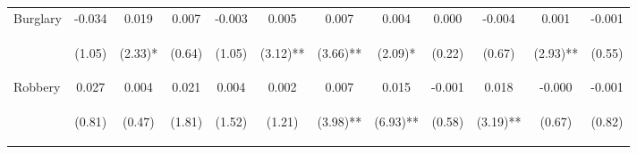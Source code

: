 \begin{tabular}{lccccccccccc}
\noalign{\smallskip}Burglary & -0.034 & 0.019 & 0.007 & -0.003 & 0.005 & 0.007 & 0.004 & 0.000 & -0.004 & 0.001 & -0.001\\
 & \begin{footnotesize}(1.05)\end{footnotesize} & \begin{footnotesize}(2.33)*\end{footnotesize} & \begin{footnotesize}(0.64)\end{footnotesize} & \begin{footnotesize}(1.05)\end{footnotesize} & \begin{footnotesize}(3.12)**\end{footnotesize} & \begin{footnotesize}(3.66)**\end{footnotesize} & \begin{footnotesize}(2.09)*\end{footnotesize} & \begin{footnotesize}(0.22)\end{footnotesize} & \begin{footnotesize}(0.67)\end{footnotesize} & \begin{footnotesize}(2.93)**\end{footnotesize} & \begin{footnotesize}(0.55)\end{footnotesize}\\
\noalign{\smallskip}Robbery & 0.027 & 0.004 & 0.021 & 0.004 & 0.002 & 0.007 & 0.015 & -0.001 & 0.018 & -0.000 & -0.001\\
 & \begin{footnotesize}(0.81)\end{footnotesize} & \begin{footnotesize}(0.47)\end{footnotesize} & \begin{footnotesize}(1.81)\end{footnotesize} & \begin{footnotesize}(1.52)\end{footnotesize} & \begin{footnotesize}(1.21)\end{footnotesize} & \begin{footnotesize}(3.98)**\end{footnotesize} & \begin{footnotesize}(6.93)**\end{footnotesize} & \begin{footnotesize}(0.58)\end{footnotesize} & \begin{footnotesize}(3.19)**\end{footnotesize} & \begin{footnotesize}(0.67)\end{footnotesize} & \begin{footnotesize}(0.82)\end{footnotesize}\\

\end{tabular}
